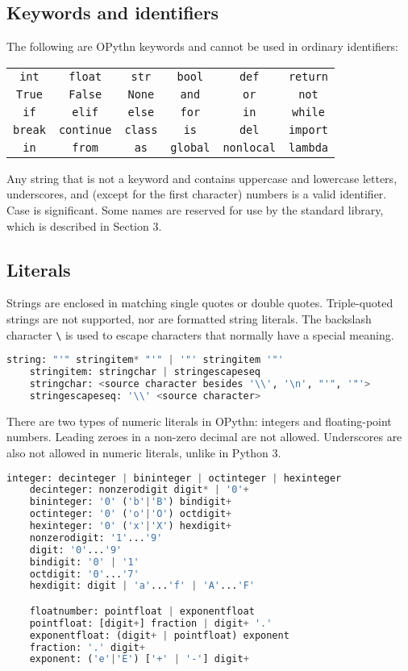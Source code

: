 \documentclass[11pt, twoside]{article}
\newcommand{\ms}{\texttt}
\begin{document}
    \subsection{Keywords and identifiers}
    The following are OPythn keywords and cannot be used in ordinary identifiers:
    \begin{center}
        \begin{tabular}{cccccc}
            \ms{int} & \ms{float} & \ms{str} & \ms{bool} & \ms{def} & \ms{return}\\
            \ms{True} & \ms{False} & \ms{None} & \ms{and} & \ms{or} & \ms{not}\\
            \ms{if} & \ms{elif} & \ms{else} & \ms{for} & \ms{in} & \ms{while}\\
            \ms{break} & \ms{continue} & \ms{class} & \ms{is} & \ms{del} & \ms{import}\\
            \ms{in} & \ms{from} & \ms{as} &\ms{global} & \ms{nonlocal} & \ms{lambda}
    \end{tabular}
    \end{center}
    Any string that is not a keyword and contains uppercase and lowercase letters, underscores, and (except for the first character) numbers is a valid identifier. Case is significant. Some names are reserved for use by the standard library, which is described in Section 3.
    \subsection{Literals}
    Strings are enclosed in matching single quotes or double quotes. Triple-quoted strings are not supported, nor are formatted string literals. The backslash character \ms{\textbackslash} is used to escape characters that normally have a special meaning.
    \begin{lstlisting}[language=python]
    string: "'" stringitem* "'" | '"' stringitem '"'
    stringitem: stringchar | stringescapeseq
    stringchar: <source character besides '\\', '\n', "'", '"'>
    stringescapeseq: '\\' <source character>
    \end{lstlisting}
    \indent There are two types of numeric literals in OPythn: integers and floating-point numbers. Leading zeroes in a non-zero decimal are not allowed. Underscores are also not allowed in numeric literals, unlike in Python 3.
    \begin{lstlisting}[language=python]
    integer: decinteger | bininteger | octinteger | hexinteger
    decinteger: nonzerodigit digit* | '0'+
    bininteger: '0' ('b'|'B') bindigit+
    octinteger: '0' ('o'|'O') octdigit+
    hexinteger: '0' ('x'|'X') hexdigit+
    nonzerodigit: '1'...'9'
    digit: '0'...'9'
    bindigit: '0' | '1'
    octdigit: '0'...'7'
    hexdigit: digit | 'a'...'f' | 'A'...'F'

    floatnumber: pointfloat | exponentfloat
    pointfloat: [digit+] fraction | digit+ '.'
    exponentfloat: (digit+ | pointfloat) exponent
    fraction: '.' digit+
    exponent: ('e'|'E') ['+' | '-'] digit+
    \end{lstlisting}
\end{document}
